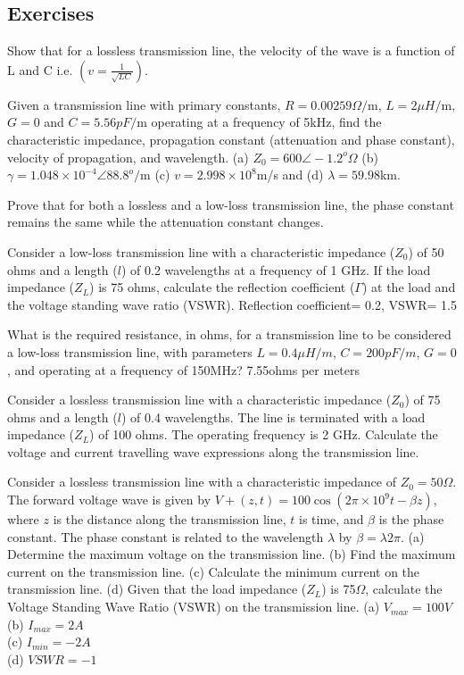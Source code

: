 \begin{mdframed}[backgroundcolor=lightblue, linewidth=1pt, hidealllines=true]
\section*{Exercises}
\begin{ExerciseList}
\Exercise[label={ex41}]
Show that for a lossless transmission line, the velocity of the wave is a function of L and C i.e. $\left(v = \frac{1}{\sqrt{LC}}\right)$.

\Exercise[label={ex42}]
Given a transmission line with primary constants, $R = 0.00259\varOmega/$m, $L = 2\mu H/$m, $G = 0$ and $C = 5.56pF/$m operating at a frequency of 5kHz, find the characteristic impedance, propagation constant (attenuation and phase constant), velocity of propagation, and wavelength.
\Answer[ref={ex42}]
(a) $Z_0 = 600\angle-1.2^o\varOmega$ (b) $\gamma = 1.048\times10^{-4}\angle88.8^o/$m (c) $v = 2.998\times10^8$m/s and (d) $\lambda = 59.98$km.

\Exercise[label={ex43}]
Prove that for both a lossless and a low-loss transmission line, the phase constant remains the same while the attenuation constant changes.

\Exercise[label={ex44}]
Consider a low-loss transmission line with a characteristic impedance ($Z_0$) of 50 ohms and a length ($l$) of 0.2 wavelengths at a frequency of 1 GHz. If the load impedance ($Z_L$) is 75 ohms, calculate the reflection coefficient ($\Gamma$) at the load and the voltage standing wave ratio (VSWR).
\Answer[ref={ex44}]
Reflection coefficient=  0.2, VSWR= 1.5

\Exercise[label={ex45}]
What is the required resistance, in ohms, for a transmission line to be considered a low-loss transmission line, with parameters $L=0.4\mu H/m$, $C=200pF/m$, $G=0$, and operating at a frequency of 150MHz?
\Answer[ref={ex45}]
7.55ohms per meters

\Exercise[label={ex46}]
Consider a lossless transmission line with a characteristic impedance ($Z_0$) of 75 ohms and a length ($l$) of 0.4 wavelengths. The line is terminated with a load impedance ($Z_L$) of 100 ohms. The operating frequency is 2 GHz.
Calculate the voltage and current travelling wave expressions along the transmission line.

\Exercise[label={ex47}]
Consider a lossless transmission line with a characteristic impedance of $Z_0=50\Omega$. The forward voltage wave is given by $V+(z,t)=100\cos(2\pi\times10^9t-\beta z)$, where $z$ is the distance along the transmission line, $t$ is time, and $\beta$ is the phase constant. The phase constant is related to the wavelength $\lambda$ by $\beta=\lambda2\pi$.
(a)	Determine the maximum voltage on the transmission line.
(b)	Find the maximum current on the transmission line.
(c)	Calculate the minimum current on the transmission line.
(d)	Given that the load impedance ($Z_L$) is 75$\Omega$, calculate the Voltage Standing Wave Ratio (VSWR) on the transmission line.
\Answer[ref={ex47}]
(a) $V_{max} = 100V$ \\
(b) $I_{max} = 2A$ \\
(c) $I_{min} = -2A$ \\
(d) $VSWR = -1$


\end{ExerciseList}
\end{mdframed}

